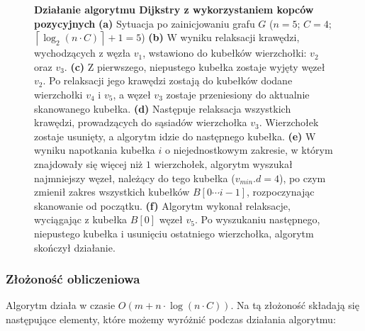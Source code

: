 \begin{figure}[!htbp]
\begin{subfigure}[b]{0.28\textwidth}
		\caption{}
	\end{subfigure}
	\caption{\textbf{Działanie algorytmu Dijkstry z wykorzystaniem kopców pozycyjnych} \textbf{(a)} Sytuacja po zainicjowaniu grafu $G$ ($n=5$; $C=4$; $ \left \lceil \log_{2} \left( n \cdot C \right) \right \rceil + 1 = 5$) \textbf{(b)} W wyniku relaksacji krawędzi, wychodzących z węzła $v_{1}$, wstawiono do kubełków wierzchołki: $v_{2}$ oraz $v_{3}$. \textbf{(c)} Z pierwszego, niepustego kubełka zostaje wyjęty węzeł $v_{2}$. Po relaksacji jego krawędzi zostają do kubełków dodane wierzchołki $v_{4}$ i $v_{5}$, a węzeł $v_{3}$ zostaje przeniesiony do aktualnie skanowanego kubełka. \textbf{(d)} Następuje relaksacja wszystkich krawędzi, prowadzących do sąsiadów wierzchołka $v_{3}$. Wierzchołek zostaje usunięty, a algorytm idzie do następnego kubełka. \textbf{(e)} W wyniku napotkania kubełka $i$ o niejednostkowym zakresie, w którym znajdowały się więcej niż $1$ wierzchołek, algorytm wyszukał najmniejszy węzeł, należący do tego kubełka ($v_{min}.d = 4$), po czym zmienił zakres wszystkich kubełków $B \left[ 0 \cdots i-1 \right]$, rozpoczynając skanowanie od początku. \textbf{(f)} Algorytm wykonał relaksacje, wyciągając z kubełka $B \left[ 0 \right]$ węzeł $v_{5}$. Po wyszukaniu następnego, niepustego kubełka i usunięciu ostatniego wierzchołka, algorytm skończył działanie. } \label{fig:exampleRadixHeapNC}
\end{figure}

\subsubsection{Złożoność obliczeniowa}

Algorytm działa w czasie $ O \left( m + n \cdot \log \left( n \cdot C \right) \right)$. Na tą złożoność składają się następujące elementy, które możemy wyróżnić podczas działania algorytmu:

